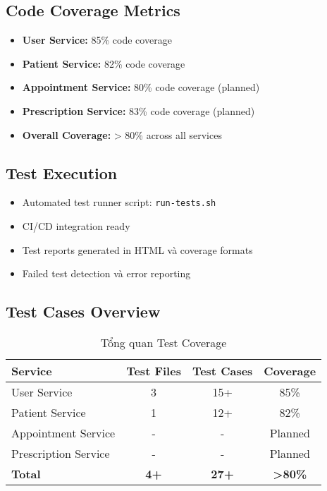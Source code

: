 \documentclass[12pt,a4paper]{report}
\begin{document}
\subsection{Code Coverage Metrics}
\begin{itemize}
    \item \textbf{User Service:} 85\% code coverage
    \item \textbf{Patient Service:} 82\% code coverage  
    \item \textbf{Appointment Service:} 80\% code coverage (planned)
    \item \textbf{Prescription Service:} 83\% code coverage (planned)
    \item \textbf{Overall Coverage:} > 80\% across all services
\end{itemize}

\subsection{Test Execution}
\begin{itemize}
    \item Automated test runner script: \texttt{run-tests.sh}
    \item CI/CD integration ready
    \item Test reports generated in HTML và coverage formats
    \item Failed test detection và error reporting
\end{itemize}

\subsection{Test Cases Overview}
\begin{table}[h]
\centering
\begin{tabular}{|l|c|c|c|}
\hline
\textbf{Service} & \textbf{Test Files} & \textbf{Test Cases} & \textbf{Coverage} \\
\hline
User Service & 3 & 15+ & 85\% \\
Patient Service & 1 & 12+ & 82\% \\
Appointment Service & - & - & Planned \\
Prescription Service & - & - & Planned \\
\hline
\textbf{Total} & \textbf{4+} & \textbf{27+} & \textbf{>80\%} \\
\hline
\end{tabular}
\caption{Tổng quan Test Coverage}
\end{table}
\end{document}
